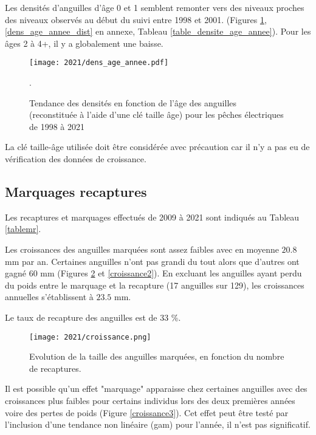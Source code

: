 \documentclass[10pt,twocolumn,titlepage,twoside]{article}\usepackage[]{graphicx}\usepackage[]{color}
\begin{document}
    
\small

\normalsize

Les densités d'anguilles d'âge 0 et 1 semblent remonter vers des
niveaux proches des niveaux observés au début du suivi entre 1998 et 2001. 
 (Figures \ref{dens_age_annee},
\ref{dens_age_annee_dist} en annexe, Tableau \ref{table_densite_age_annee}).
Pour les âges 2 à 4+, il y a globalement une baisse.

\begin{figure}[htbp]
\centering
\texttt{[image: 2021/dens\_age\_annee.pdf]}
\caption[Densité par âge.]{Tendance des densités en fonction de
l'âge des anguilles (reconstituée à l'aide d'une clé taille âge) pour
les pêches électriques de 1998 à 2021 \footnotemark}.
\label{dens_age_annee}
\end{figure}


La clé taille-âge utilisée doit être considérée avec précaution car il n'y a pas eu de
vérification des données de croissance.
\subsection{Marquages recaptures}

Les recaptures et marquages effectués de 2009 à 2021 sont indiqués au Tableau
\ref{tablemr}.

Les croissances des anguilles marquées sont
assez faibles avec en moyenne $20.8$ mm par an. Certaines anguilles
n'ont pas grandi du tout alors que
d'autres ont gagné 60 mm (Figures \ref{croissance} et \ref{croissance2}). En
excluant les anguilles ayant perdu du poids entre le marquage et la recapture
(17 anguilles sur
129), les croissances annuelles s'établissent à
$23.5$ mm.

Le taux de recapture des anguilles est de
33 \%.

\begin{figure}[htbp]
\centering
\texttt{[image: 2021/croissance.png]}
\caption[Taille anguilles marquées]{Evolution de la taille des anguilles
marquées, en fonction du nombre de recaptures.}
\label{croissance}
\end{figure}
Il est possible qu'un effet "marquage" apparaisse chez certaines anguilles avec
des croissances plus faibles pour certains individus lors des deux premières
années voire des pertes de poids (Figure \ref{croissance3}). Cet effet peut
être testé par l'inclusion d'une tendance non linéaire (gam) pour l'année, il
n'est pas significatif.
\end{document}
